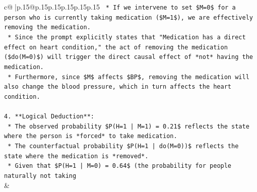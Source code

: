 \documentclass{article}
\begin{document}
{\begin{supertabular}{c@{$\;$}|p{.15\linewidth}@{}p{.15\linewidth}p{.15\linewidth}p{.15\linewidth}p{.15\linewidth}p{.15\linewidth}}
{{{\texttt{    *   If we intervene to set \$M=0\$ for a person who is currently taking medication (\$M=1\$), we are effectively removing the medication.} \\
\texttt{    *   Since the prompt explicitly states that "Medication has a direct effect on heart condition," the act of removing the medication (\$do(M=0)\$) will trigger the direct causal effect of *not* having the medication.} \\
\texttt{    *   Furthermore, since \$M\$ affects \$BP\$, removing the medication will also change the blood pressure, which in turn affects the heart condition.} \\
\\ 
\texttt{4.  **Logical Deduction**:} \\
\texttt{    *   The observed probability \$P(H=1 | M=1) = 0.21\$ reflects the state where the person is *forced* to take medication.} \\
\texttt{    *   The counterfactual probability \$P(H=1 | do(M=0))\$ reflects the state where the medication is *removed*.} \\
\texttt{    *   Given that \$P(H=1 | M=0) = 0.64\$ (the probability for people naturally not taking} \\
            }
        }
    }
    & \\ \\


\end{supertabular}}
\end{document}
